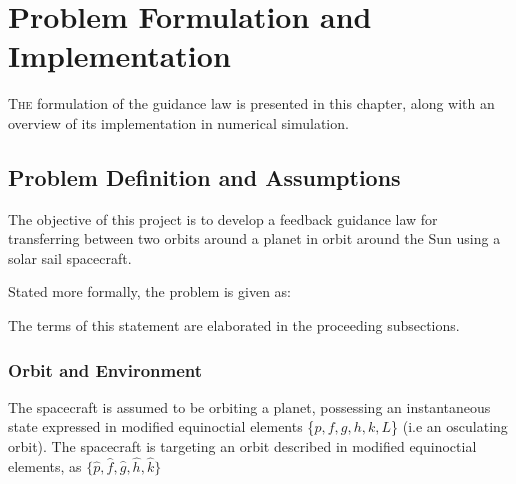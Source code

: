 \chapter{Problem Formulation and Implementation}

\lettrine{T}{he} formulation of the guidance law is presented in this chapter, along with an overview of its implementation in numerical simulation.

\section{Problem Definition and Assumptions}
The objective of this project is to develop a feedback guidance law for transferring between two orbits around a planet in orbit around the Sun using a solar sail spacecraft.

Stated more formally, the problem is given as:


The terms of this statement are elaborated in the proceeding subsections.

\subsection{Orbit and Environment}
\label{sec:orbit_environment}
The spacecraft is assumed to be orbiting a planet, possessing an instantaneous state expressed in modified equinoctial elements \{\(p, f, g, h, k, L\)\} (i.e an osculating orbit). The spacecraft is targeting an orbit described in modified equinoctial elements, as \(\{\hat{p}, \hat{f}, \hat{g}, \hat{h}, \hat{k}\}\)

